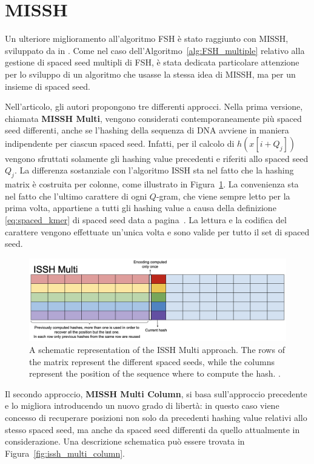 \section{MISSH}
\label{sec:MISSH}

Un ulteriore miglioramento all'algoritmo \acs{FSH} è stato raggiunto con \acs{MISSH}, sviluppato da \citeauthor*{mian2023missh} in  \cite{mian2023missh}. Come nel caso dell'Algoritmo~\ref{alg:FSH_multiple} relativo alla gestione di spaced seed multipli di \acs{FSH}, è stata dedicata particolare attenzione per lo sviluppo di un algoritmo che usasse la stessa idea di \acs{MISSH}, ma per un insieme di spaced seed.

Nell'articolo, gli autori propongono tre differenti approcci. Nella prima versione, chiamata \textbf{MISSH Multi}, vengono considerati contemporaneamente più spaced seed differenti, anche se l'hashing della sequenza di \acs{DNA} avviene in maniera indipendente per ciascun spaced seed. Infatti, per il calcolo di $h(x[i + Q_j])$ vengono sfruttati solamente gli hashing value precedenti e riferiti allo spaced seed $Q_j$. La differenza sostanziale con l'algoritmo \acs{ISSH} sta nel fatto che la hashing matrix è costruita per colonne, come illustrato in Figura~\ref{fig:issh_multi}. La convenienza sta nel fatto che l'ultimo carattere di ogni $Q$-gram, che viene sempre letto per la prima volta, appartiene a tutti gli hashing value a causa della definizione \ref{eq:spaced_kmer} di spaced seed data a pagina~\pageref{eq:spaced_kmer}. La lettura e la codifica del carattere vengono effettuate un'unica volta e sono valide per tutto il set di spaced seed.

\begin{figure}[!ht]
	\centering
	\includegraphics[width=0.85\linewidth]{images/issh_multi}
	\caption{A schematic representation of the ISSH Multi approach. The rows of the matrix represent the different spaced seeds, while the columns represent the position of the sequence where to compute the hash. \cite{mian2023missh}.}
	\label{fig:issh_multi}
\end{figure}

Il secondo approccio, \textbf{MISSH Multi Column}, si basa sull'approccio precedente e lo migliora introducendo un nuovo grado di libertà: in questo caso viene concesso di recuperare posizioni non solo da precedenti hashing value relativi allo stesso spaced seed, ma anche da spaced seed differenti da quello attualmente in considerazione. Una descrizione schematica può essere trovata in Figura~\ref{fig:issh_multi_column}.

